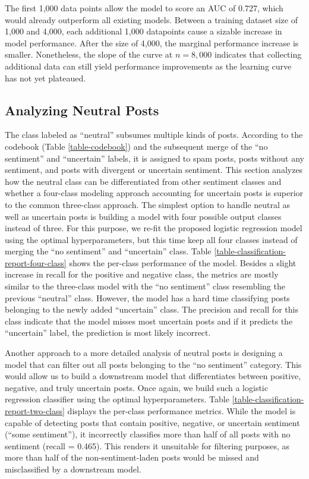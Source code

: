 The first 1,000 data points allow the model to score an AUC of 0.727, which would already outperform all existing models. Between a training dataset size of 1,000 and 4,000, each additional 1,000 datapoints cause a sizable increase in model performance. After the size of 4,000, the marginal performance increase is smaller. Nonetheless, the slope of the curve at $n=8,000$ indicates that collecting additional data can still yield performance improvements as the learning curve has not yet plateaued. 

\subsection{Analyzing Neutral Posts}
\label{section-post-hoc-classes}
The class labeled as ``neutral'' subsumes multiple kinds of posts. According to the codebook (Table \ref{table-codebook}) and the subsequent merge of the ``no sentiment'' and ``uncertain'' labels, it is assigned to spam posts, posts without any sentiment, and posts with divergent or uncertain sentiment. This section analyzes how the neutral class can be differentiated from other sentiment classes and whether a four-class modeling approach accounting for uncertain posts is superior to the common three-class approach.\newline
The simplest option to handle neutral as well as uncertain posts is building a model with four possible output classes instead of three. For this purpose, we re-fit the proposed logistic regression model using the optimal hyperparameters, but this time keep all four classes instead of merging the ``no sentiment'' and ``uncertain'' class. Table \ref{table-classification-report-four-class} shows the per-class performance of the model. Besides a slight increase in recall for the positive and negative class, the metrics are mostly similar to the three-class model with the ``no sentiment'' class resembling the previous ``neutral'' class. However, the model has a hard time classifying posts belonging to the newly added ``uncertain'' class. The precision and recall for this class indicate that the model misses most uncertain posts and if it predicts the ``uncertain'' label, the prediction is most likely incorrect.



Another approach to a more detailed analysis of neutral posts is designing a model that can filter out all posts belonging to the ``no sentiment'' category. This would allow us to build a downstream model that differentiates between positive, negative, and truly uncertain posts. Once again, we build such a logistic regression classifier using the optimal hyperparameters. Table \ref{table-classification-report-two-class} displays the per-class performance metrics. While the model is capable of detecting posts that contain positive, negative, or uncertain sentiment (``some sentiment''), it incorrectly classifies more than half of all posts with no sentiment (recall = 0.465). This renders it unsuitable for filtering purposes, as more than half of the non-sentiment-laden posts would be missed and misclassified by a downstream model.

